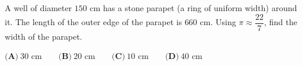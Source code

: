 A well of diameter $150$ cm has a stone parapet (a ring of uniform width) around it. The length of the outer edge of the parapet is $660$ cm. Using $\pi\approx\dfrac{22}{7}$, find the width of the parapet.

$\textbf{(A)}\ 30\text{ cm}\qquad\textbf{(B)}\ 20\text{ cm}\qquad\textbf{(C)}\ 10\text{ cm}\qquad\textbf{(D)}\ 40\text{ cm}$
